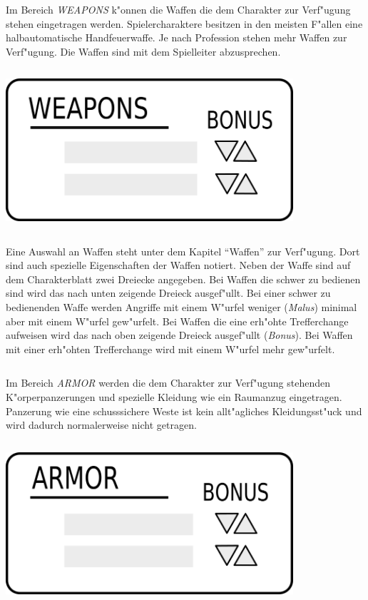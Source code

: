 \begin{column}[l]{0.55}
    Im Bereich \emph{WEAPONS} k"onnen die Waffen die dem Charakter zur Verf"ugung stehen eingetragen werden. Spielercharaktere besitzen in den meisten F"allen eine halbautomatische Handfeuerwaffe. Je nach Profession stehen mehr Waffen zur Verf"ugung. Die Waffen sind mit dem Spielleiter abzusprechen. 
\end{column}
\begin{column}[r]{0.45}
    \centering
    \includegraphics[width=0.80\textwidth]{images/character_weapons.png}
\end{column}
\medskip

Eine Auswahl an Waffen steht unter dem Kapitel "`Waffen"' zur Verf"ugung. Dort sind auch spezielle Eigenschaften der Waffen notiert. Neben der Waffe sind auf dem Charakterblatt zwei Dreiecke angegeben. Bei Waffen die schwer zu bedienen sind wird das nach unten zeigende Dreieck ausgef"ullt. Bei einer schwer zu bedienenden Waffe werden Angriffe mit einem W"urfel weniger (\emph{Malus}) minimal aber mit einem W"urfel gew"urfelt. Bei Waffen die eine erh"ohte Trefferchange aufweisen wird das nach oben zeigende Dreieck ausgef"ullt (\emph{Bonus}). Bei Waffen mit einer erh"ohten Trefferchange wird mit einem W"urfel mehr gew"urfelt.

\begin{column}[l]{0.55}
    Im Bereich \emph{ARMOR} werden die dem Charakter zur Verf"ugung stehenden K"orperpanzerungen und spezielle Kleidung wie ein Raumanzug eingetragen. Panzerung wie eine schusssichere Weste ist kein allt"agliches Kleidungsst"uck und wird dadurch normalerweise nicht getragen. 
\end{column}
\begin{column}[r]{0.45}
    \centering
    \includegraphics[width=0.80\textwidth]{images/character_armor.png}
\end{column}
\medskip


